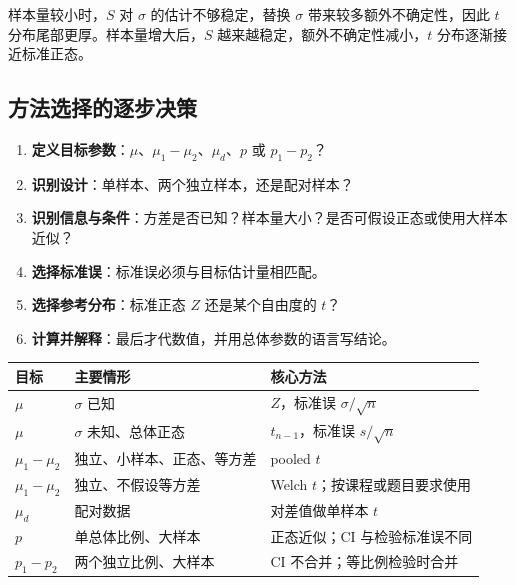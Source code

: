 \documentclass[11pt,a4paper]{article}
\begin{document}
\begin{intuitionbox}
样本量较小时，$S$ 对 $\sigma$ 的估计不够稳定，替换 $\sigma$ 带来较多额外不确定性，因此 $t$ 分布尾部更厚。样本量增大后，$S$ 越来越稳定，额外不确定性减小，$t$ 分布逐渐接近标准正态。
\end{intuitionbox}

\subsection{方法选择的逐步决策}

\begin{methodbox}[任何均值或比例推断题的决策顺序]
\begin{enumerate}
  \item \textbf{定义目标参数}：$\mu$、$\mu_1-\mu_2$、$\mu_d$、$p$ 或 $p_1-p_2$？
  \item \textbf{识别设计}：单样本、两个独立样本，还是配对样本？
  \item \textbf{识别信息与条件}：方差是否已知？样本量大小？是否可假设正态或使用大样本近似？
  \item \textbf{选择标准误}：标准误必须与目标估计量相匹配。
  \item \textbf{选择参考分布}：标准正态 $Z$ 还是某个自由度的 $t$？
  \item \textbf{计算并解释}：最后才代数值，并用总体参数的语言写结论。
\end{enumerate}
\end{methodbox}

\begin{center}
\renewcommand{\arraystretch}{1.23}
\begin{tabularx}{\textwidth}{p{2.3cm}p{4.0cm}X}
\toprule
目标 & 主要情形 & 核心方法\\
\midrule
$\mu$ & $\sigma$ 已知 & $Z$，标准误 $\sigma/\sqrt n$\\
$\mu$ & $\sigma$ 未知、总体正态 & $t_{n-1}$，标准误 $s/\sqrt n$\\
$\mu_1-\mu_2$ & 独立、小样本、正态、等方差 & pooled $t$\\
$\mu_1-\mu_2$ & 独立、不假设等方差 & Welch $t$；按课程或题目要求使用\\
$\mu_d$ & 配对数据 & 对差值做单样本 $t$\\
$p$ & 单总体比例、大样本 & 正态近似；CI 与检验标准误不同\\
$p_1-p_2$ & 两个独立比例、大样本 & CI 不合并；等比例检验时合并\\
\bottomrule
\end{tabularx}
\end{center}
\end{document}
